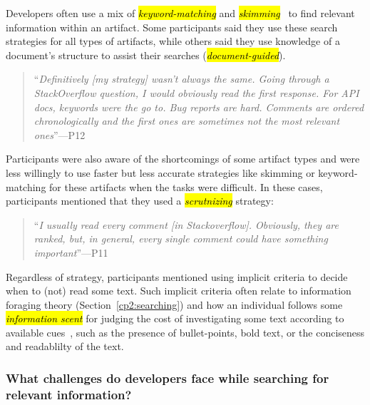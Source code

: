 Developers often use a mix of \hl{\textit{keyword-matching}} and \hl{\textit{skimming}}~\cite{Starke2009, Ko2006a} to find relevant information within an artifact. 
Some participants said they use these search strategies for all types of artifacts, while others said they use knowledge of a document's structure to assist their searches (\hl{\textit{document-guided}}).



\smallskip
\begin{quote}
    ``\textit{Definitively [my strategy] wasn't always the same. Going through a StackOverflow question, I would obviously read the first response. For API docs, keywords were the go to. Bug reports are hard. Comments are ordered chronologically and the first ones are sometimes not the most relevant ones}''---P12
\end{quote}


Participants were also aware of the shortcomings of some artifact types and were less willingly to use faster but less accurate strategies like skimming or keyword-matching for these artifacts when the tasks were difficult. 
In these cases, participants mentioned that they used a \hl{\textit{scrutnizing}} strategy:


\smallskip
\begin{quote}
    ``\textit{I usually read every comment [in Stackoverflow]. Obviously, they are ranked, but, in general, every single comment could have something important}''---P11
\end{quote}
    


Regardless of strategy, participants mentioned using 
implicit criteria to decide when to (not) read some text.
Such implicit criteria often relate to information foraging theory (Section~\ref{cp2:searching}) and how an individual follows some
\hl{\textit{information scent}} for judging the cost of investigating some text according to available cues~\cite{Pirolli1999}, such as the presence of bullet-points, bold text, or the conciseness and readablilty of the text.



\subsubsection{What challenges do developers face while searching for relevant information?}
\label{cp3:search-challenges}


